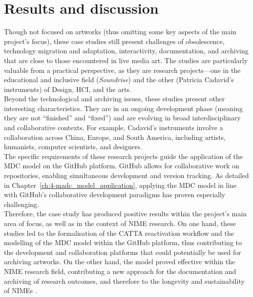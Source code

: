 \section{Results and discussion}
Though not focused on artworks (thus omitting some key aspects of the main project's focus), these case studies still present challenges of obsolescence, technology migration and adaptation, interactivity, documentation, and archiving that are close to those encountered in live media art. The studies are particularly valuable from a practical perspective, as they are research projects—one in the educational and inclusive field (\textit{Soundrise}) and the other (Patricia Cadavid’s instruments) of Design, HCI, and the arts.\\
Beyond the technological and archiving issues, these studies present other interesting characteristics. They are in an ongoing development phase (meaning they are not ``finished'' and ``fixed'') and are evolving in broad interdisciplinary and collaborative contexts. For example, Cadavid’s instruments involve a collaboration across China, Europe, and South America, including artists, humanists, computer scientists, and designers.\\
The specific requirements of these research projects guide the application of the MDC model on the GitHub platform. GitHub allows for collaborative work on repositories, enabling simultaneous development and version tracking. As detailed in Chapter~\ref{ch:4-madc_model_application}, applying the MDC model in line with GitHub’s collaborative development paradigms has proven especially challenging.\\
Therefore, the case study has produced positive results within the project’s main area of focus, as well as in the context of NIME research. On one hand, these studies led to the formalisation of the CATTA reactivation workflow and the modelling of the MDC model within the GitHub platform, thus contributing to the development and collaboration platforms that could potentially be used for archiving artworks. On the other hand, the model proved effective within the NIME research field, contributing a new approach for the documentation and archiving of research outcomes, and therefore to the longevity and sustainability of NIMEs \cite{fiordelmondo2024nime}.

